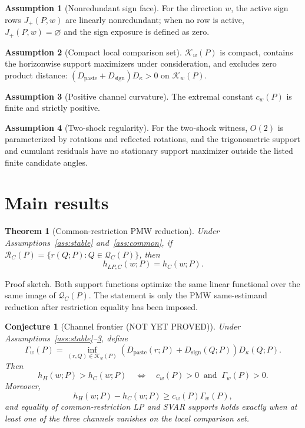 \documentclass[11pt]{article}
\theoremstyle{definition}
\newtheorem{assumption}{Assumption}
\theoremstyle{plain}
\newtheorem{theorem}{Theorem}
\newtheorem{conjecture}{Conjecture}
\theoremstyle{remark}
\begin{document}
\begin{assumption}[Nonredundant sign face]\label{ass:signface}
For the direction \(w\), the active sign rows \(J_+(P,w)\) are linearly
nonredundant; when no row is active, \(J_+(P,w)=\varnothing\) and the sign
exposure is defined as zero.
\end{assumption}

\begin{assumption}[Compact local comparison set]\label{ass:compact}
\(\mathcal K_w(P)\) is compact, contains the horizonwise support maximizers
under consideration, and excludes zero product distance:
\((D_{\mathrm{paste}}+D_{\mathrm{sign}})D_\kappa>0\) on
\(\mathcal K_w(P)\).
\end{assumption}

\begin{assumption}[Positive channel curvature]\label{ass:curvature}
The extremal constant \(c_w(P)\) is finite and strictly positive.
\end{assumption}

\begin{assumption}[Two-shock regularity]\label{ass:twoshock}
For the two-shock witness, \(O(2)\) is parameterized by rotations and reflected
rotations, and the trigonometric support and cumulant residuals have no
stationary support maximizer outside the listed finite candidate angles.
\end{assumption}

\section{Main results}
\begin{theorem}[Common-restriction PMW reduction]\label{thm:pmw-common}
Under Assumptions~\ref{ass:stable} and~\ref{ass:common}, if
\(\mathcal R_C(P)=\{r(Q;P):Q\in\mathcal Q_C(P)\}\), then
\[
h_{LP,C}(w;P)=h_C(w;P).
\]
\end{theorem}
Proof sketch. Both support functions optimize the same linear functional over
the same image of \(\mathcal Q_C(P)\). The statement is only the PMW
same-estimand reduction after restriction equality has been imposed.

\begin{conjecture}[Channel frontier (NOT YET PROVED)]\label{conj:frontier}
Under Assumptions~\ref{ass:stable}--\ref{ass:curvature}, define
\[
\Gamma_w(P)=
\inf_{(r,Q)\in\mathcal K_w(P)}
(D_{\mathrm{paste}}(r;P)+D_{\mathrm{sign}}(Q;P))D_\kappa(Q;P).
\]
Then
\[
h_H(w;P)>h_C(w;P)
\quad\Longleftrightarrow\quad
c_w(P)>0\ \text{ and }\ \Gamma_w(P)>0.
\]
Moreover,
\[
h_H(w;P)-h_C(w;P)\ge c_w(P)\Gamma_w(P),
\]
and equality of common-restriction LP and SVAR supports holds exactly when at
least one of the three channels vanishes on the local comparison set.
\end{conjecture}
\end{document}
